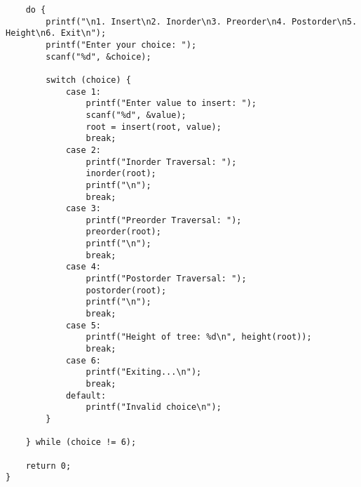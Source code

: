 \documentclass[12pt,a4paper]{article}
\begin{document}
\begin{lstlisting}
    do {
        printf("\n1. Insert\n2. Inorder\n3. Preorder\n4. Postorder\n5. Height\n6. Exit\n");
        printf("Enter your choice: ");
        scanf("%d", &choice);

        switch (choice) {
            case 1:
                printf("Enter value to insert: ");
                scanf("%d", &value);
                root = insert(root, value);
                break;
            case 2:
                printf("Inorder Traversal: ");
                inorder(root);
                printf("\n");
                break;
            case 3:
                printf("Preorder Traversal: ");
                preorder(root);
                printf("\n");
                break;
            case 4:
                printf("Postorder Traversal: ");
                postorder(root);
                printf("\n");
                break;
            case 5:
                printf("Height of tree: %d\n", height(root));
                break;
            case 6:
                printf("Exiting...\n");
                break;
            default:
                printf("Invalid choice\n");
        }

    } while (choice != 6);

    return 0;
}
\end{lstlisting}

\newpage
\end{document}

